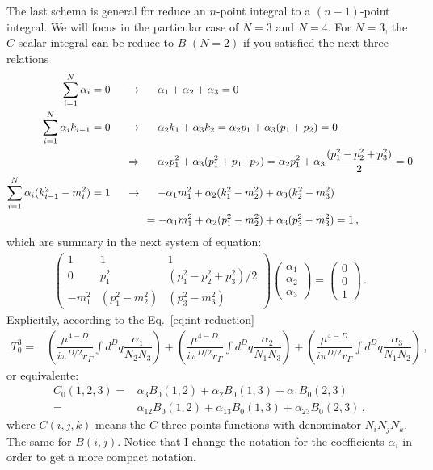 The last schema is general for reduce an $n$-point integral to a $(n-1)$-point integral. We will focus in the particular case of $N=3$ and $N=4$.
%
For $N=3$, the $C$ scalar integral can be reduce to $B$ $(N=2)$ if you satisfied the next three relations
\begin{align}
\sum_{i=1}^N\alpha_i = 0 \hspace{0.5 cm} &\rightarrow \hspace{0.5  cm} \alpha_1+\alpha_2+\alpha_3=0 \\
\sum_{i=1}^N\alpha_ik_{i-1} = 0 \hspace{0.5  cm} &\rightarrow \hspace{0.5  cm} \alpha_2k_1+\alpha_3k_2=\alpha_2p_1+\alpha_3(p_1+p_2)=0 \nonumber \\ 
& \Rightarrow \hspace{0.5  cm} \alpha_2p_1^2+\alpha_3(p_1^2+p_1\cdot p_2)= \alpha_2p_1^2+\alpha_3\dfrac{(p_1^2-p_2^2+p_3^2)}{2}=0 \\
\sum_{i=1}^N\alpha_i (k_{i-1}^2-m_i^2) = 1\hspace{0.5  cm} &\rightarrow \hspace{0.5  cm} 
-\alpha_1m_1^2+ \alpha_2(k_1^2-m_2^2)+ \alpha_3(k_2^2-m_3^2)\nonumber\\
&\hspace{0.6 cm}=-\alpha_1m_1^2+ \alpha_2(p_1^2-m_2^2)+ \alpha_3(p_3^2-m_3^2)=1\,,
\end{align} 
which are summary in the next system of equation:
\begin{align}
\begin{pmatrix}
1 & 1 & 1 \\
0 & p_1^2 & (p_1^2-p_2^2+p_3^2)/2 \\
 -m_1^2 & (p_1^2-m_2^2) & (p_3^2-m_3^2)
\end{pmatrix}
\begin{pmatrix}
\alpha_1 \\ \alpha_2 \\ \alpha_3
\end{pmatrix}=
\begin{pmatrix}
0 \\ 0 \\ 1
\end{pmatrix}\,.
\end{align}
%
Explicitily, according to the Eq.~\eqref{eq:int-reduction}
\begin{align}
\label{eq:t30}
T^3_0=& \left(\dfrac{\mu^{4-D}}{i\pi^{D/2}r_{\Gamma}}\int d^Dq \dfrac{\alpha_1}{N_2N_3}\right)
+\left(\dfrac{\mu^{4-D}}{i\pi^{D/2}r_{\Gamma}}\int d^Dq \dfrac{\alpha_2}{N_1N_3}\right)
+\left(\dfrac{\mu^{4-D}}{i\pi^{D/2}r_{\Gamma}}\int d^Dq \dfrac{\alpha_3}{N_1N_2}\right)\,,
\end{align}
or equivalente:
\begin{align}
C_0(1,2,3)=&\alpha_3B_0(1,2)+\alpha_2B_0(1,3) +\alpha_1B_0(2,3)\nonumber \\
=& \alpha_{12}B_0(1,2)+\alpha_{13}B_0(1,3)+\alpha_{23}B_0(2,3)\,, 
\end{align}
where $C(i,j,k)$ means the $C$ three points functions with denominator $N_iN_jN_k$. The same for $B(i,j)$. Notice that I change the notation for the coefficients $\alpha_i$ in order to get a more compact notation. 

